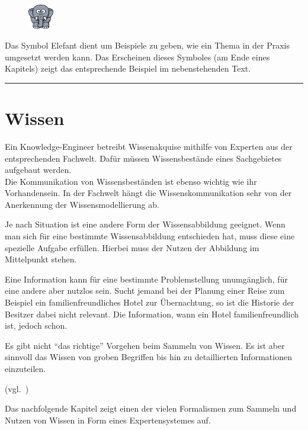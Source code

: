 \vspace{30pt}

\begin{figure}
    \vspace{-12pt}
    \includegraphics[width=0.1\textwidth]{bilder/elephant.png}\protect\footnotemark{}
\end{figure}
Das Symbol Elefant dient um Beispiele zu geben, wie ein Thema in der Praxis umgesetzt werden kann. Das Erscheinen dieses Symboles (am Ende eines Kapitels) zeigt das entsprechende Beispiel im nebenstehenden Text.\\

\noindent\rule[1ex]{\textwidth}{1pt}

\newpage

\section{Wissen}
\label{chap:einleitung_wissen}
Ein Knowledge-Engineer betreibt Wissenakquise mithilfe von Experten aus der entsprechenden Fachwelt. Dafür müssen Wissensbestände eines Sachgebietes aufgebaut werden. \\
Die Kommunikation von Wissensbeständen ist ebenso wichtig wie ihr Vorhandensein. In der Fachwelt hängt die Wissenskommunikation sehr von der Anerkennung der Wissensmodellierung ab.

Je nach Situation ist eine andere Form der Wissensabbildung geeignet. Wenn man sich für eine bestimmte Wissensabbildung entschieden hat, muss diese eine spezielle Aufgabe erfüllen. Hierbei muss der Nutzen der Abbildung im Mittelpunkt stehen.

Eine Information kann für eine bestimmte Problemstellung unumgänglich, für eine andere aber nutzlos sein. Sucht jemand bei der Planung einer Reise zum Beispiel ein familienfreundliches Hotel zur Übernachtung, so ist die Historie der Besitzer dabei nicht relevant. Die Information, wann ein Hotel familienfreundlich ist, jedoch schon.

Es gibt nicht ``das richtige'' Vorgehen beim Sammeln von Wissen. Es ist aber sinnvoll das Wissen von groben Begriffen bis hin zu detaillierten Informationen einzuteilen.

(vgl.~\cite[S. 287]{IspekOntoBedeutung})

Das nachfolgende Kapitel zeigt einen der vielen Formalismen zum Sammeln und Nutzen von Wissen in Form eines Expertensystemes auf.
